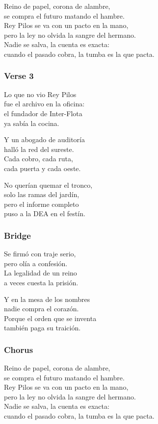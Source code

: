 Reino de papel, corona de alambre,\\
se compra el futuro matando el hambre.\\
Rey Pilos se va con un pacto en la mano,\\
pero la ley no olvida la sangre del hermano.\\
Nadie se salva, la cuenta es exacta:\\
cuando el pasado cobra, la tumba es la que pacta.

\subsubsection{Verse 3}\label{verse-3-14}

Lo que no vio Rey Pilos\\
fue el archivo en la oficina:\\
el fundador de Inter-Flota\\
ya sabía la cocina.

Y un abogado de auditoría\\
halló la red del sureste.\\
Cada cobro, cada ruta,\\
cada puerta y cada oeste.

No querían quemar el tronco,\\
solo las ramas del jardín,\\
pero el informe completo\\
puso a la DEA en el festín.

\subsubsection{Bridge}\label{bridge-18}

Se firmó con traje serio,\\
pero olía a confesión.\\
La legalidad de un reino\\
a veces cuesta la prisión.

Y en la mesa de los nombres\\
nadie compra el corazón.\\
Porque el orden que se inventa\\
también paga su traición.

\subsubsection{Chorus}\label{chorus-61}

Reino de papel, corona de alambre,\\
se compra el futuro matando el hambre.\\
Rey Pilos se va con un pacto en la mano,\\
pero la ley no olvida la sangre del hermano.\\
Nadie se salva, la cuenta es exacta:\\
cuando el pasado cobra, la tumba es la que pacta.

